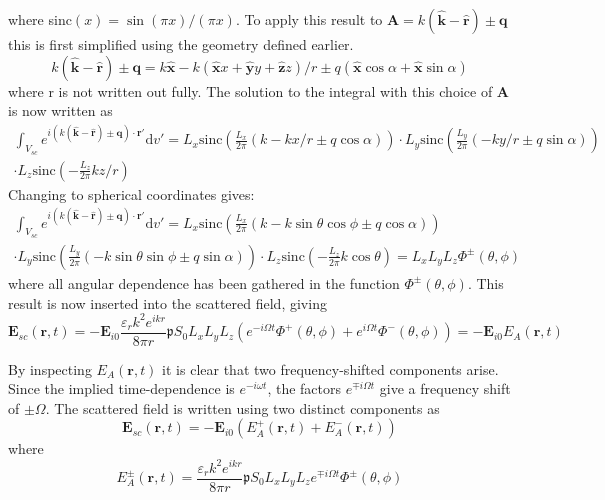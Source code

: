 \documentclass[10pt,a4paper,draft]{scrartcl}
\begin{document}
	where sinc$(x) = \sin(\pi x)/(\pi x)$. To apply this result to $\bm{A} = k(\bm{\hat{k}} - \bm{\hat{r}}) \pm \bm{q}$ this is first simplified using the geometry defined earlier.
	\begin{equation*}
		k(\bm{\hat{k}} - \bm{\hat{r}}) \pm \bm{q} = k\bm{\hat{x}} - k(\bm{\hat{x}} x + \bm{\hat{y}} y + \bm{\hat{z}} z)/r \pm q(\bm{\hat{x}} \cos{\alpha} + \bm{\hat{x}} \sin{\alpha})
	\end{equation*}
	where r is not written out fully. The solution to the integral with this choice of $\bm{A}$ is now written as
	\begin{multline*}
		\int_{V_{sc}} e^{i(	k(\bm{\hat{k}} - \bm{\hat{r}}) \pm \bm{q}) \cdot \bm{r}'} \mathrm{d}v' =
		L_x \text{sinc} \left( \frac{L_x}{2\pi} ( k - kx/r \pm q\cos{\alpha} ) \right) \cdot
		L_y \text{sinc} \left( \frac{L_y}{2\pi} ( - ky/r \pm q\sin{\alpha} ) \right) \\
		\cdot L_z \text{sinc} \left( -\frac{L_z}{2\pi} kz/r \right)
	\end{multline*}
	Changing to spherical coordinates gives:
	\begin{multline*}
	\int_{V_{sc}} e^{i(	k(\bm{\hat{k}} - \bm{\hat{r}}) \pm \bm{q}) \cdot \bm{r}'} \mathrm{d}v' =
	L_x \text{sinc} \left( \frac{L_x}{2\pi} ( k - k\sin{\theta}\cos{\phi} \pm q\cos{\alpha} ) \right) \\
	\cdot L_y \text{sinc} \left( \frac{L_y}{2\pi} ( - k\sin{\theta}\sin{\phi} \pm q\sin{\alpha} ) \right)
	\cdot L_z \text{sinc} \left( -\frac{L_z}{2\pi} k\cos{\theta} \right) = L_x L_y L_z \Phi^\pm (\theta,\phi)
	\end{multline*}
	where all angular dependence has been gathered in the function $\Phi^\pm (\theta,\phi)$. This result is now inserted into the scattered field, giving
	\begin{equation*}
		\bm{E}_{sc}(\bm{r},t) = -\bm{E}_{i0} \frac{\varepsilon_rk^2 e^{ikr}}{8\pi r} \mathfrak{p} S_0 L_x L_y L_z \left( e^{-i\Omega t} \Phi^+ (\theta,\phi)  + e^{i\Omega t} \Phi^- (\theta,\phi) \right) = -\bm{E}_{i0} E_A(\bm{r},t)
	\end{equation*}
	
	By inspecting $E_A(\bm{r},t)$ it is clear that two frequency-shifted components arise. Since the implied time-dependence is $e^{-i\omega t}$, the factors $e^{\mp i\Omega t}$ give a frequency shift of $\pm \Omega$. The scattered field is written using two distinct components as
	\begin{equation*}
		\bm{E}_{sc} (\bm{r},t) = -\bm{E}_{i0} \left( E_A^+ (\bm{r},t) + E_A^- (\bm{r},t) \right)
	\end{equation*}
	where
	\begin{equation*}
		E_A^\pm (\bm{r},t) = \frac{\varepsilon_rk^2 e^{ikr}}{8\pi r} \mathfrak{p} S_0 L_x L_y L_z e^{\mp i\Omega t} \Phi^\pm (\theta,\phi)
	\end{equation*}
	
\end{document}

